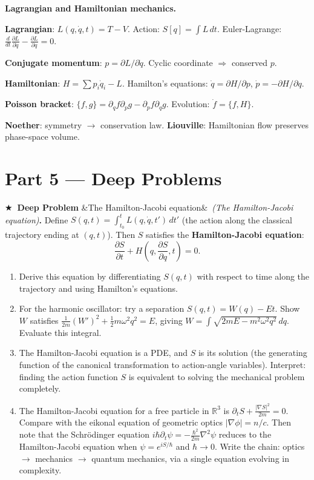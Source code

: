 \documentclass[12pt,a4paper]{article}
\newcounter{problem}
\newcounter{deepproblem}
\newenvironment{deepproblem}[1][]{\refstepcounter{deepproblem}\par\vspace{6pt}\noindent\textbf{\color{NavyBlue}$\bigstar$\ Deep Problem \thedeepproblem}\ifx&#1&\else\ \textit{(#1)}\fi\textbf{.}\enskip}{\par\vspace{4pt}}
\begin{document}
\begin{namebox}
\textbf{Lagrangian and Hamiltonian mechanics.}

\textbf{Lagrangian}: $L(q,\dot q,t) = T-V$. Action: $S[q]=\int L\,dt$. Euler-Lagrange: $\frac{d}{dt}\frac{\partial L}{\partial\dot q}-\frac{\partial L}{\partial q}=0$.

\textbf{Conjugate momentum}: $p=\partial L/\partial\dot q$. Cyclic coordinate $\Rightarrow$ conserved $p$.

\textbf{Hamiltonian}: $H=\sum p_i\dot q_i-L$. Hamilton's equations: $\dot q=\partial H/\partial p$, $\dot p=-\partial H/\partial q$.

\textbf{Poisson bracket}: $\{f,g\}=\partial_q f\partial_p g - \partial_p f\partial_q g$. Evolution: $\dot f=\{f,H\}$.

\textbf{Noether}: symmetry $\to$ conservation law. \textbf{Liouville}: Hamiltonian flow preserves phase-space volume.
\end{namebox}

\section{Part 5 \texorpdfstring{---}{--} Deep Problems}

\begin{deepproblem}[The Hamilton-Jacobi equation]
Define $S(q,t) = \int_{t_0}^t L(q,\dot q,t')\,dt'$ (the action along the classical trajectory ending at $(q,t)$). Then $S$ satisfies the \textbf{Hamilton-Jacobi equation}:
\[
  \frac{\partial S}{\partial t} + H\left(q,\frac{\partial S}{\partial q},t\right) = 0.
\]
\begin{enumerate}[label=(\alph*)]
  \item Derive this equation by differentiating $S(q,t)$ with respect to time along the trajectory and using Hamilton's equations.
  \item For the harmonic oscillator: try a separation $S(q,t) = W(q)-Et$. Show $W$ satisfies $\frac{1}{2m}(W')^2+\frac{1}{2}m\omega^2 q^2=E$, giving $W = \int\sqrt{2mE-m^2\omega^2 q^2}\,dq$. Evaluate this integral.
  \item The Hamilton-Jacobi equation is a PDE, and $S$ is its solution (the generating function of the canonical transformation to action-angle variables). Interpret: finding the action function $S$ is equivalent to solving the mechanical problem completely.
  \item The Hamilton-Jacobi equation for a free particle in $\mathbb{R}^3$ is $\partial_t S + \frac{|\nabla S|^2}{2m}=0$. Compare with the eikonal equation of geometric optics $|\nabla\phi|=n/c$. Then note that the Schr\"{o}dinger equation $i\hbar\partial_t\psi=-\frac{\hbar^2}{2m}\nabla^2\psi$ reduces to the Hamilton-Jacobi equation when $\psi=e^{iS/\hbar}$ and $\hbar\to 0$. Write the chain: optics $\to$ mechanics $\to$ quantum mechanics, via a single equation evolving in complexity.
\end{enumerate}
\end{deepproblem}
\end{document}
